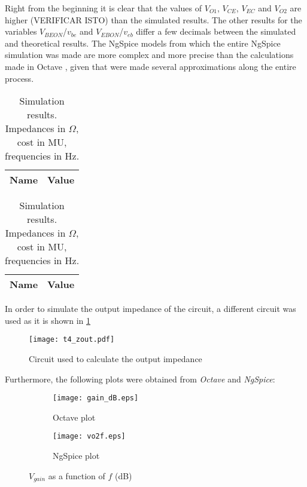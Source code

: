 Right from the beginning it is clear that the values of $V_{O1}$, $V_{CE}$, $V_{EC}$ and $V_{O2}$ are higher (VERIFICAR ISTO) than the simulated results. The other results for the variables $V_{BEON}$/$v_{be}$ and $V_{EBON}$/$v_{eb}$ differ a few decimals between the simulated and theoretical results. The NgSpice \cite{bib:ngspice} models from which the entire NgSpice simulation was made are more complex and more precise than the calculations made in Octave \cite{bib:octave}, given that were made several approximations along the entire process.
\begin{table}[H]
\parbox{.5\linewidth}{
\centering                
\def\arraystretch{1}        %

\begin{tabular}{c|c}        %
\hline                      %

\textbf{Name}  & \textbf{Value}\\     
\hline                      %

\hline                      %
\end{tabular}
\captionsetup{justification=justified, margin=0.5cm} 
\caption{Theoretical results. Impedances in $\Omega$, cost in MU, frequencies in Hz.}
\label{tab9}
}
\hfill
\parbox{.5\linewidth}{
\centering
\def\arraystretch{1}

\begin{tabular}{c|c}
\hline    
\textbf{Name} & \textbf{Value} \\ \hline

\hline
\end{tabular}
\captionsetup{justification=justified, margin=0.5cm} 
\caption{Simulation results. Impedances in $\Omega$, cost in MU, frequencies in Hz.}
\label{tab10}
}
\end{table}

In order to simulate the output impedance of the circuit, a different circuit was used as it is shown in \ref{z_out}
 
\begin{figure}[H] \centering
\texttt{[image: t4\_zout.pdf]}
\caption{Circuit used to calculate the output impedance}
\label{z_out}
\end{figure}


Furthermore, the following plots were obtained from \emph{Octave} and \emph{NgSpice}:
\begin{figure}[H]
\centering
\begin{subfigure}{0.5\textwidth}
  \centering
  \texttt{[image: gain\_dB.eps]}
  \caption{Octave plot}
  \label{fig:sub1}
\end{subfigure}%
\begin{subfigure}{.5\textwidth}
  \centering
  \texttt{[image: vo2f.eps]}
  \caption{NgSpice plot}
  \label{fig:sub2}
\end{subfigure}
\caption{$V_{gain}$ as a function of $f$ (dB)}
\label{fig:test}
\end{figure}

